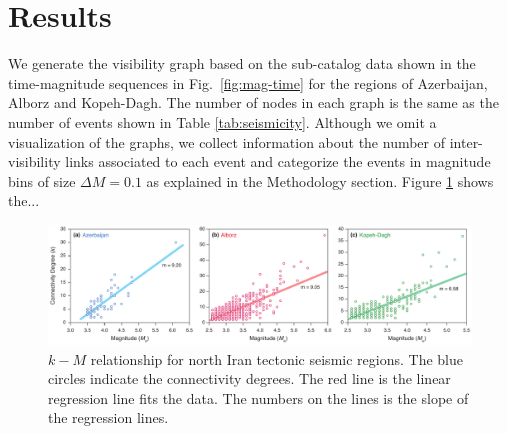 
\section{Results}

We generate the visibility graph based on the sub-catalog data shown in the time-magnitude sequences in Fig.~\ref{fig:mag-time} for the regions of Azerbaijan, Alborz and Kopeh-Dagh. The number of nodes in each graph is the same as the number of events shown in Table \ref{tab:seismicity}. Although we omit a visualization of the graphs, we collect information about the number of inter-visibility links associated to each event and categorize the events in magnitude bins of size $\Delta M = 0.1$ as explained in the Methodology section. Figure \ref{fig:km} shows the...




\begin{figure}[t]
	\centering
	\includegraphics[width=\textwidth]{figures/pdf/figure-06} 
	\caption{$k-M$ relationship for north Iran tectonic seismic regions. The blue circles indicate the connectivity degrees. The red line is the linear regression line fits the data. The numbers on the lines is the slope of the regression lines.}
	\label{fig:km}
\end{figure}


